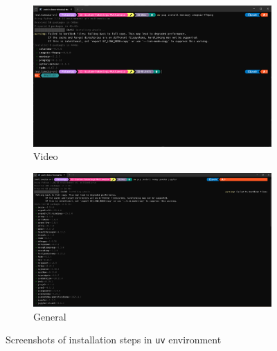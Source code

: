 \documentclass[11pt,a4paper]{article}
\begin{document}
\begin{itemize}[leftmargin=*]
\begin{figure}[h]
      \vspace{0.5em}

      \begin{subfigure}[b]{0.48\textwidth}
        \includegraphics[width=\linewidth]{Figure/img4.png} %
        \caption{Video}
      \end{subfigure}\hfill
      \begin{subfigure}[b]{0.48\textwidth}
        \includegraphics[width=\linewidth]{Figure/img5.png}
        \caption{General}
      \end{subfigure}

      \caption{Screenshots of installation steps in \texttt{uv} environment}
      \label{fig:uv-install-steps}
    \end{figure}
\end{itemize}
\end{document}
